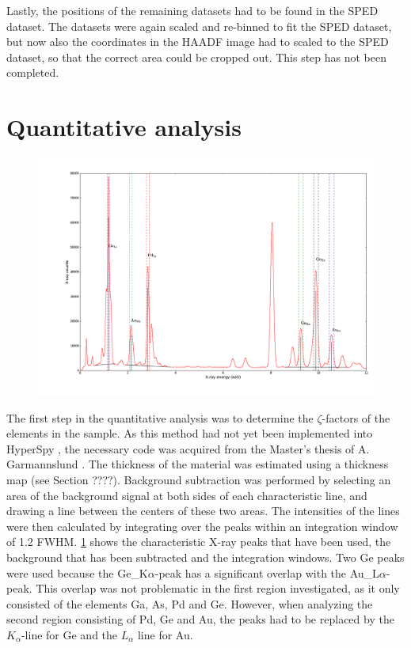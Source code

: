 Lastly, the positions of the remaining datasets had to be found in the SPED dataset. The datasets were again scaled and re-binned to fit the SPED dataset, but now also the coordinates in the HAADF image had to scaled to the SPED dataset, so that the correct area could be cropped out. This step has not been completed.

\section{Quantitative analysis}

\begin{figure}
	\centering
	\includegraphics[width=0.7\linewidth]{fig/other/UnheatedA-full-spectrum2}
	\caption{}
	\label{fig:spectrum-with-info}
\end{figure}
The first step in the quantitative analysis was to determine the $\zeta$-factors of the elements in the sample. As this method had not yet been implemented into HyperSpy \cite{hyperspy}, the necessary code was acquired from the Master's thesis of A. Garmannslund \cite{andreas}. The thickness of the material was estimated using a thickness map (see Section ????). Background subtraction was performed by selecting an area of the background signal at both sides of each characteristic line, and drawing a line between the centers of these two areas. The intensities of the lines were then calculated by integrating over the peaks within an integration window of 1.2 FWHM. \cref{fig:spectrum-with-info} shows the characteristic X-ray peaks that have been used, the background that has been subtracted and the integration windows. Two Ge peaks were used because the Ge\_{K$\alpha$}-peak has a significant overlap with the Au\_{L$\alpha$}-peak. This overlap was not problematic in the first region investigated, as it only consisted of the elements Ga, As, Pd and Ge. However, when analyzing the second region consisting of Pd, Ge and Au, the peaks had to be replaced by the $K_\alpha$-line for Ge and the $L_\alpha$ line for Au.

